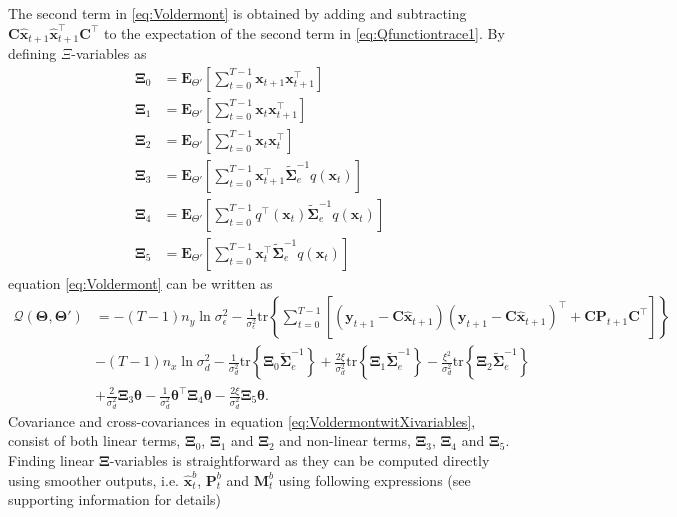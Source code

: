 \documentclass[]{article}
\begin{document}
The second term in \eqref{eq:Voldermont} is obtained by adding and subtracting $\mathbf C \mathbf{\hat{x}}_{t+1} \mathbf{\hat{x}}_{t+1}^\top \mathbf C^\top$ to the expectation of the second term in \eqref{eq:Qfunctiontrace1}. By defining $\Xi$-variables as 
\begin{align}
	\boldsymbol\Xi_{0}&=\mathbf E_{\Theta'}\left[\sum_{t=0}^{T-1}\mathbf x_{t+1}\mathbf x_{t+1}^\top\right]\label{eq:defofXi0} \\
\boldsymbol\Xi_{1}&=\mathbf E_{\Theta'}\left[\sum_{t=0}^{T-1}\mathbf x_t\mathbf x_{t+1}^\top\right]\label{eq:defofXi1} \\
\boldsymbol\Xi_{2}&=\mathbf E_{\Theta'}\left[\sum_{t=0}^{T-1}\mathbf x_t\mathbf x_{t}^\top\right]\\
\boldsymbol\Xi_{3}&=\mathbf E_{\Theta'}\left[\sum_{t=0}^{T-1}\mathbf x_{t+1}^\top\tilde{\boldsymbol\Sigma}_e^{-1}q( \mathbf x_t)\right] \label{eq:Xi3} \\	
\boldsymbol\Xi_{4}&= \mathbf E_{\Theta'}\left[\sum_{t=0}^{T-1}  q^\top(\mathbf  x_t)\tilde{\boldsymbol\Sigma}_e^{-1}q(\mathbf x_t)\right] \label{eq:Xi4}\\
 \boldsymbol\Xi_{5}&=\mathbf E_{\Theta'}\left[\sum_{t=0}^{T-1} \mathbf x_t^\top\tilde{\boldsymbol\Sigma}_e^{-1}q(\mathbf x_t)  \right] \label{eq:Xi5}
 \end{align}
equation \eqref{eq:Voldermont} can be written as
\begin{align}\label{eq:VoldermontwitXivariables}
 \mathcal Q(\boldsymbol \Theta,\boldsymbol\Theta')&=-(T-1)n_y\ln \sigma_{\epsilon}^2-\frac{1}{\sigma_{\epsilon}^2}\mathrm{tr}\left\lbrace\boldsymbol\sum_{t=0}^{T-1}\left[ (\mathbf y_{t+1}-\mathbf C\mathbf{\hat{x}}_{t+1}) (\mathbf y_{t+1}-\mathbf C\mathbf{\hat{x}}_{t+1})^\top+\mathbf C \mathbf P_{t+1}\mathbf C^\top\right] \right\rbrace\nonumber \\
&-(T-1)n_x\ln\sigma_d^2-\frac{1}{\sigma_d^2}\mathrm{tr}\left\lbrace \boldsymbol\Xi_{0} \tilde{\boldsymbol\Sigma}_e^{-1}\right\rbrace +\frac{2\xi}{\sigma_d^2} \mathrm{tr}\left\lbrace \boldsymbol\Xi_{1} \tilde{\boldsymbol\Sigma}_e^{-1}\right\rbrace -  \frac{\xi^2}{\sigma_d^2}\mathrm{tr} \left\lbrace\boldsymbol\Xi_{2}\tilde{\boldsymbol\Sigma}_e^{-1} \right\rbrace 
 \nonumber \\
&+\frac{2}{\sigma_d^2}\boldsymbol\Xi_{3}\boldsymbol\theta-\frac{1}{\sigma_d^2}\boldsymbol\theta^\top \boldsymbol\Xi_{4}\boldsymbol\theta-\frac{2\xi}{\sigma_d^2}\boldsymbol \Xi_{5} \boldsymbol\theta.
\end{align}
Covariance and cross-covariances in equation \eqref{eq:VoldermontwitXivariables}, consist of both linear terms, $\boldsymbol\Xi_0$, $\boldsymbol\Xi_1$ and $\boldsymbol\Xi_2$ and non-linear terms, $\boldsymbol\Xi_3$, $\boldsymbol\Xi_4$ and  $\boldsymbol\Xi_5$. Finding linear $\boldsymbol\Xi$-variables is straightforward as they can be computed directly using smoother outputs, i.e. $\hat{\mathbf x}_t^b $, $\mathbf P_t^b$ and $\mathbf M_t^b$ using following expressions \cite{Gibsona2005} (see supporting information for details)
\end{document}
